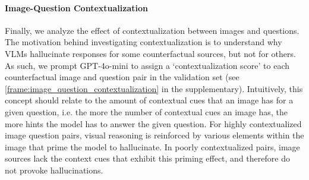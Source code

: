 \paragraph{Image-Question Contextualization}
Finally, we analyze the effect of contextualization between images and questions. The motivation behind investigating contextualization is to understand why VLMs hallucinate responses for some counterfactual sources, but not for others. As such, we prompt GPT-4o-mini to assign a `contextualization score' to each counterfactual image and question pair in the \segsub validation set (see \autoref{frame:image_question_contextualization} in the supplementary).  Intuitively, this concept should relate to the amount of contextual cues that an image has for a given question, i.e. the more the number of contextual cues an image has, the more hints the model has to answer the given question. For highly contextualized image question pairs, visual reasoning is reinforced by various elements within the image that prime the model to hallucinate. In poorly contextualized pairs, image sources lack the context cues that exhibit this priming effect, and therefore do not provoke hallucinations.




